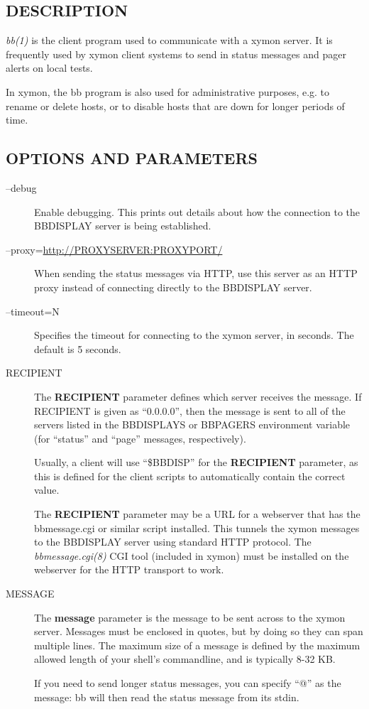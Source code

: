 \subsection{DESCRIPTION}
\emph{bb(1)} is the client program used to communicate with a xymon
server. It is frequently used by xymon client systems to send in
status messages and pager alerts on local tests. 


In xymon, the bb program is also used for administrative purposes,
e.g. to rename or delete hosts, or to disable hosts that are down for
longer periods of time. 

 
\subsection{OPTIONS AND PARAMETERS}
\begin{description}

\item[--debug] Enable debugging. This prints out details about how the
  connection to the BBDISPLAY server is being established. 

\item[--proxy=\url{http://PROXYSERVER:PROXYPORT/}] When sending the
  status messages via HTTP, use this server as an HTTP proxy instead
  of connecting directly to the BBDISPLAY server. 

\item[--timeout=N] Specifies the timeout for connecting to the xymon
  server, in seconds. The default is 5 seconds. 

\item[RECIPIENT] The \textbf{RECIPIENT}
 parameter defines which server receives the message. If RECIPIENT is
 given as ``0.0.0.0'', then the message is sent to all of the servers
 listed in the BBDISPLAYS or BBPAGERS environment variable (for
 ``status'' and ``page'' messages, respectively). 

Usually, a client will use ``\$BBDISP'' for the \textbf{RECIPIENT}
parameter, as this is defined for the client scripts to automatically
contain the correct value. 


The \textbf{RECIPIENT} parameter may be a URL for a webserver that
has the bbmessage.cgi or similar script installed. This tunnels the
xymon messages to the BBDISPLAY server using standard HTTP
protocol. The \emph{bbmessage.cgi(8)} CGI tool (included in xymon)
must be installed on the webserver for the HTTP transport to work.  


\item[MESSAGE] The \textbf{message} parameter is the message to be
  sent across to the xymon server. Messages must be enclosed in
  quotes, but by doing so they can span multiple lines. The maximum
  size of a message is defined by the maximum allowed length of your
  shell's commandline, and is typically  8-32 KB. 

If you need to send longer status messages, you can specify ``@'' as
the message: bb will then read the status message from its stdin. 


\end{description}

